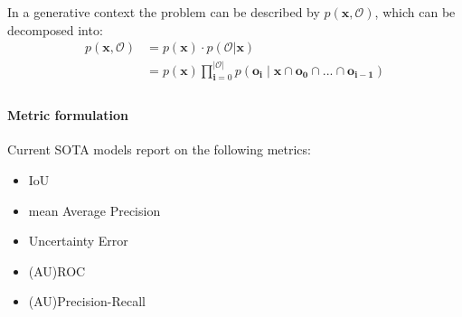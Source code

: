 In a generative context the problem can be described by $p(\mathbf{x}, \mathcal{O})$, which can be decomposed into:
\begin{align}
    p(\mathbf{x}, \mathcal{O}) & = p(\mathbf{x}) \cdot p(\mathbf{\mathcal{O}} | \mathbf{x}) \label{eq:generative_model}                                                \\
                               & = p(\mathbf{x})\prod_{\mathbf{i} = 0}^{|\mathcal{O}|}p(\mathbf{o_i} \mid \mathbf{x} \cap \mathbf{o_0} \cap ... \cap \mathbf{o_{i-1}}) \\
\end{align}

\paragraph*{Metric formulation}
Current SOTA models report on the following metrics:
\begin{itemize}
    \item IoU
    \item mean Average Precision
    \item Uncertainty Error \cite{miller2019evaluating}
    \item (AU)ROC \cite{miller2019evaluating}
    \item (AU)Precision-Recall \cite{saito2015pr}
\end{itemize}



